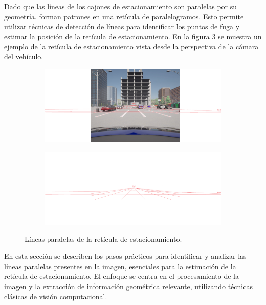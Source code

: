\noindent
Dado que las líneas de los cajones de estacionamiento son paralelas por su geometría, forman patrones en una retícula de paralelogramos.
Esto permite utilizar técnicas de detección de líneas para identificar los puntos de fuga y estimar la posición de la retícula de estacionamiento.
En la figura \ref{fig:reticule_pov} se muestra un ejemplo de la retícula de estacionamiento vista desde la perspectiva de la cámara del vehículo.

\begin{figure}[!ht]
    \centering
    \begin{subfigure}{0.8\textwidth}
        \includegraphics[width=\textwidth]{img/reticule/pov_reticule}\label{fig:pov_reticule}
    \end{subfigure}
    \begin{subfigure}{0.8\textwidth}
        \includegraphics[width=\textwidth]{img/reticule/pov_reticule_layer}\label{fig:pov_reticule_layers}
    \end{subfigure}
    \caption{Líneas paralelas de la retícula de estacionamiento.}
    \label{fig:reticule_pov}
\end{figure}

\noindent
En esta sección se describen los pasos prácticos para identificar y analizar las líneas paralelas presentes en la imagen,
esenciales para la estimación de la retícula de estacionamiento.
El enfoque se centra en el procesamiento de la imagen y la extracción de información geométrica relevante,
utilizando técnicas clásicas de visión computacional.


